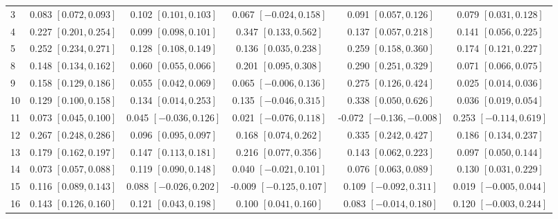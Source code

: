 \begin{landscape}
\begin{longtable}{lccccc}
3 & 0.083 {\scriptsize$[0.072,0.093]$} & 0.102 {\scriptsize$[0.101,0.103]$} & 0.067 {\scriptsize$[-0.024,0.158]$} & 0.091 {\scriptsize$[0.057,0.126]$} & 0.079 {\scriptsize$[0.031,0.128]$} \\
4 & 0.227 {\scriptsize$[0.201,0.254]$} & 0.099 {\scriptsize$[0.098,0.101]$} & 0.347 {\scriptsize$[0.133,0.562]$} & 0.137 {\scriptsize$[0.057,0.218]$} & 0.141 {\scriptsize$[0.056,0.225]$} \\
5 & 0.252 {\scriptsize$[0.234,0.271]$} & 0.128 {\scriptsize$[0.108,0.149]$} & 0.136 {\scriptsize$[0.035,0.238]$} & 0.259 {\scriptsize$[0.158,0.360]$} & 0.174 {\scriptsize$[0.121,0.227]$} \\
8 & 0.148 {\scriptsize$[0.134,0.162]$} & 0.060 {\scriptsize$[0.055,0.066]$} & 0.201 {\scriptsize$[0.095,0.308]$} & 0.290 {\scriptsize$[0.251,0.329]$} & 0.071 {\scriptsize$[0.066,0.075]$} \\
9 & 0.158 {\scriptsize$[0.129,0.186]$} & 0.055 {\scriptsize$[0.042,0.069]$} & 0.065 {\scriptsize$[-0.006,0.136]$} & 0.275 {\scriptsize$[0.126,0.424]$} & 0.025 {\scriptsize$[0.014,0.036]$} \\
10 & 0.129 {\scriptsize$[0.100,0.158]$} & 0.134 {\scriptsize$[0.014,0.253]$} & 0.135 {\scriptsize$[-0.046,0.315]$} & 0.338 {\scriptsize$[0.050,0.626]$} & 0.036 {\scriptsize$[0.019,0.054]$} \\
11 & 0.073 {\scriptsize$[0.045,0.100]$} & 0.045 {\scriptsize$[-0.036,0.126]$} & 0.021 {\scriptsize$[-0.076,0.118]$} & -0.072 {\scriptsize$[-0.136,-0.008]$} & 0.253 {\scriptsize$[-0.114,0.619]$} \\
12 & 0.267 {\scriptsize$[0.248,0.286]$} & 0.096 {\scriptsize$[0.095,0.097]$} & 0.168 {\scriptsize$[0.074,0.262]$} & 0.335 {\scriptsize$[0.242,0.427]$} & 0.186 {\scriptsize$[0.134,0.237]$} \\
13 & 0.179 {\scriptsize$[0.162,0.197]$} & 0.147 {\scriptsize$[0.113,0.181]$} & 0.216 {\scriptsize$[0.077,0.356]$} & 0.143 {\scriptsize$[0.062,0.223]$} & 0.097 {\scriptsize$[0.050,0.144]$} \\
14 & 0.073 {\scriptsize$[0.057,0.088]$} & 0.119 {\scriptsize$[0.090,0.148]$} & 0.040 {\scriptsize$[-0.021,0.101]$} & 0.076 {\scriptsize$[0.063,0.089]$} & 0.130 {\scriptsize$[0.031,0.229]$} \\
15 & 0.116 {\scriptsize$[0.089,0.143]$} & 0.088 {\scriptsize$[-0.026,0.202]$} & -0.009 {\scriptsize$[-0.125,0.107]$} & 0.109 {\scriptsize$[-0.092,0.311]$} & 0.019 {\scriptsize$[-0.005,0.044]$} \\
16 & 0.143 {\scriptsize$[0.126,0.160]$} & 0.121 {\scriptsize$[0.043,0.198]$} & 0.100 {\scriptsize$[0.041,0.160]$} & 0.083 {\scriptsize$[-0.014,0.180]$} & 0.120 {\scriptsize$[-0.003,0.244]$} \\

\end{longtable}
\end{landscape}
